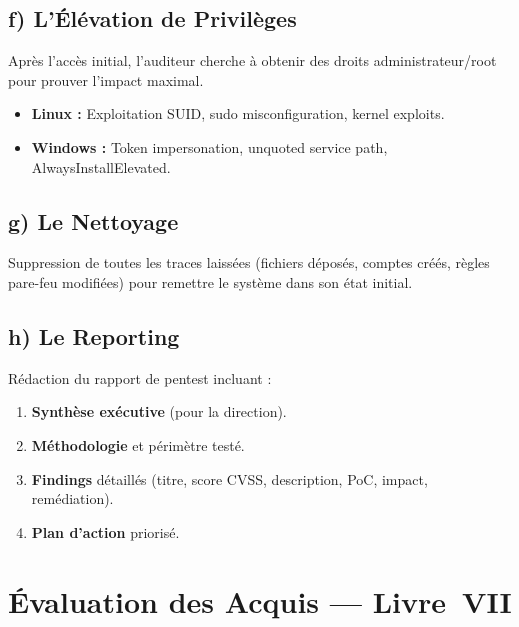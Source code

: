 \subsection{f) L'Élévation de Privilèges}
Après l'accès initial, l'auditeur cherche à obtenir des droits administrateur/root pour prouver l'impact maximal.
\begin{itemize}
    \item \textbf{Linux :} Exploitation SUID, sudo misconfiguration, kernel exploits.
    \item \textbf{Windows :} Token impersonation, unquoted service path, AlwaysInstallElevated.
\end{itemize}

\subsection{g) Le Nettoyage}
Suppression de toutes les traces laissées (fichiers déposés, comptes créés, règles pare-feu modifiées) pour remettre le système dans son état initial.

\subsection{h) Le Reporting}
Rédaction du rapport de pentest incluant :
\begin{enumerate}
    \item \textbf{Synthèse exécutive} (pour la direction).
    \item \textbf{Méthodologie} et périmètre testé.
    \item \textbf{Findings} détaillés (titre, score CVSS, description, PoC, impact, remédiation).
    \item \textbf{Plan d'action} priorisé.
\end{enumerate}

\section{Évaluation des Acquis --- Livre~VII}

